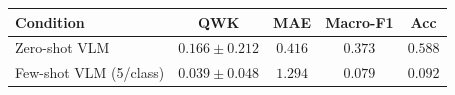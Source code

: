\begin{tabular}{lcccc}
\toprule
Condition & QWK & MAE & Macro-F1 & Acc \\
\midrule
Zero-shot VLM & $0.166\pm0.212$ & $0.416$ & $0.373$ & $0.588$ \\
Few-shot VLM (5/class) & $0.039\pm0.048$ & $1.294$ & $0.079$ & $0.092$ \\
\bottomrule
\end{tabular}